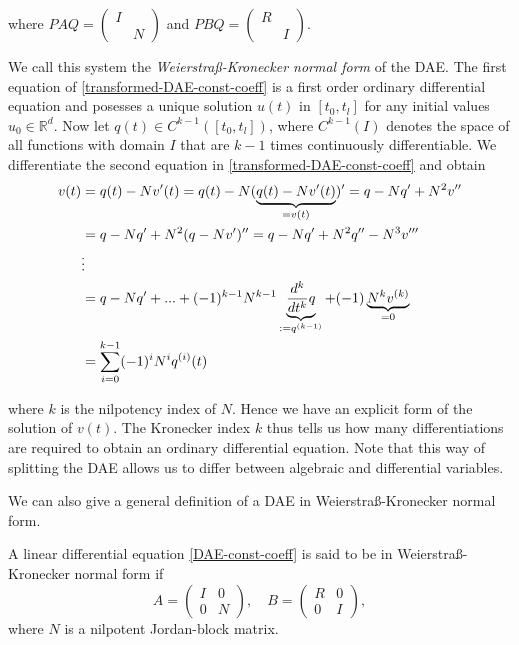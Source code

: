 where $PAQ = 
\left( 
\begin{matrix}
	I & \\
	 & N
\end{matrix} 
\right)$
and $PBQ = 
\left( 
\begin{matrix}
	R & \\
	 & I
\end{matrix} 
\right)$.

We call this system the\emph{ Weierstraß-Kronecker normal form} of the DAE. The first equation of \eqref{transformed-DAE-const-coeff} is a first order ordinary differential equation and posesses a unique solution $u(t)$ in $[t_0,t_l]$ for any initial values $u_0 \in \mathbb{R}^d$. Now let $q(t) \in C^{k-1}([t_0,t_l])$, where $C^{k-1}(I)$ denotes the space of all functions with domain $I$ that are $k-1$ times continuously differentiable. We differentiate the second equation in \eqref{transformed-DAE-const-coeff} and obtain
\begin{align}
	\notag
	v(t) &= q(t) - Nv'(t) = q(t) - N(\underbrace{q(t)-Nv'(t)}_{=v(t)})' = q-Nq'+N^2v'' \\ \notag
	&= q-Nq'+N^2(q-Nv')'' = q-Nq'+N^2q''-N^3v''' \\ \notag
	&\vdots \\ \notag
	&= q-Nq'+...+(-1)^{k-1}N^{k-1}\underbrace{\frac{d^k}{dt^k}q}_{:=q^{(k-1)}}+(-1) \underbrace{N^kv^{(k)}}_{=0}\\ 
	\label{solution-to-transformed-DAE-const-coeff-part2}
	&= \sum_{i=0}^{k-1} (-1)^iN^iq^{(i)}(t)
\end{align}

where $k$ is the nilpotency index of $N$. Hence we have an explicit  form of the solution of $v(t)$. The Kronecker index $k$ thus tells us how many differentiations are required to obtain an ordinary differential equation. Note that this way of splitting the DAE allows us to differ between algebraic and differential variables.

We can also give a general definition of a DAE in Weierstraß-Kronecker normal form.
\begin{definition}
	A linear differential equation \eqref{DAE-const-coeff} is said to be in Weierstraß-Kronecker normal form if
	\begin{displaymath}
		A = 
		\left(
		\begin{matrix}
			I & 0 \\
			0 & N
		\end{matrix}
		\right), \quad
		B = 
		\left(
		\begin{matrix}
			R & 0 \\
			0 & I
		\end{matrix}
		\right),
	\end{displaymath}
	where $N$ is a nilpotent Jordan-block matrix.
\end{definition}

